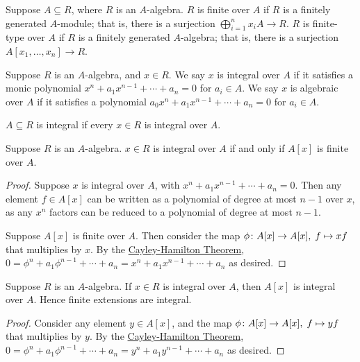 \begin{definition}
    Suppose \(A \subseteq R\), where \(R\) is an \(A\)-algebra.
    \(R\) is finite over \(A\) if \(R\) is a finitely generated \(A\)-module;
    that is, there is a surjection \(\bigoplus_{i=1}^n x_i A \to R\).
    \(R\) is finite-type over \(A\) if \(R\) is a finitely generated \(A\)-algebra;
    that is, there is a surjection \(A[x_1,\hdots,x_n] \to R\).
\end{definition}
\begin{definition}
    Suppose \(R\) is an \(A\)-algebra, and \(x \in R\).
    We say \(x\) is integral over \(A\) if it satisfies a monic polynomial
    \(x^n + a_1 x^{n-1} + \cdots + a_n = 0\) for \(a_i \in A\).
    We say \(x\) is algebraic over \(A\) if it satisfies a polynomial
    \(a_0 x^n + a_1 x^{n-1} + \cdots + a_n = 0\) for \(a_i \in A\).
\end{definition}
\begin{definition}
    \(A \subseteq R\) is integral if every \(x \in R\) is integral over \(A\).
\end{definition}
\begin{lemma}\label{lem:integral-finite}
    Suppose \(R\) is an \(A\)-algebra.
    \(x \in R\) is integral over \(A\) if and only if \(A[x]\) is finite over \(A\).
\end{lemma}
\begin{proof}
    Suppose \(x\) is integral over \(A\),
    with \(x^n + a_1x^{n-1} + \cdots + a_n = 0\).
    Then any element \(f \in A[x]\) can be written as a polynomial of degree at most \(n-1\) over \(x\),
    as any \(x^n\) factors can be reduced to a polynomial of degree at most \(n-1\).

    Suppose \(A[x]\) is finite over \(A\).
    Then consider the map \(\phi\colon A[x]\to A[x],\;f\mapsto xf\) that multiplies by \(x\).
    By the \hyperref[lem:cayley-hamilton]{Cayley-Hamilton Theorem},
    \(0 = \phi^n + a_1\phi^{n-1} + \cdots + a_n = x^n + a_1 x^{n-1} + \cdots + a_n\) as desired.
\end{proof}
\begin{corollary}
    Suppose \(R\) is an \(A\)-algebra.
    If \(x \in R\) is integral over \(A\),
    then \(A[x]\) is integral over \(A\).
    Hence finite extensions are integral.
\end{corollary}
\begin{proof}
    Consider any element \(y \in A[x]\),
    and the map \(\phi\colon A[x]\to A[x],\;f\mapsto yf\) that multiplies by \(y\).
    By the \hyperref[lem:cayley-hamilton]{Cayley-Hamilton Theorem},
    \(0 = \phi^n + a_1\phi^{n-1} + \cdots + a_n = y^n + a_1 y^{n-1} + \cdots + a_n\) as desired.
\end{proof}
